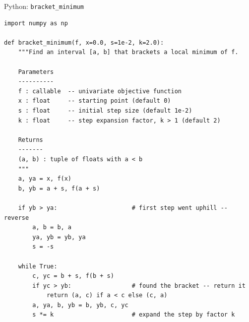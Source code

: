 \documentclass[aspectratio=169,10pt]{beamer}
\begin{document}
\begin{frame}[fragile]{Python: \texttt{bracket\_minimum}}
\begin{lstlisting}[style=pycode, caption={Python implementation of Algorithm 3.1 (bracket\_minimum)}]
import numpy as np

def bracket_minimum(f, x=0.0, s=1e-2, k=2.0):
    """Find an interval [a, b] that brackets a local minimum of f.

    Parameters
    ----------
    f : callable  -- univariate objective function
    x : float     -- starting point (default 0)
    s : float     -- initial step size (default 1e-2)
    k : float     -- step expansion factor, k > 1 (default 2)

    Returns
    -------
    (a, b) : tuple of floats with a < b
    """
    a, ya = x, f(x)
    b, yb = a + s, f(a + s)

    if yb > ya:                     # first step went uphill -- reverse
        a, b = b, a
        ya, yb = yb, ya
        s = -s

    while True:
        c, yc = b + s, f(b + s)
        if yc > yb:                 # found the bracket -- return it
            return (a, c) if a < c else (c, a)
        a, ya, b, yb = b, yb, c, yc
        s *= k                      # expand the step by factor k
\end{lstlisting}
\end{frame}
\end{document}

